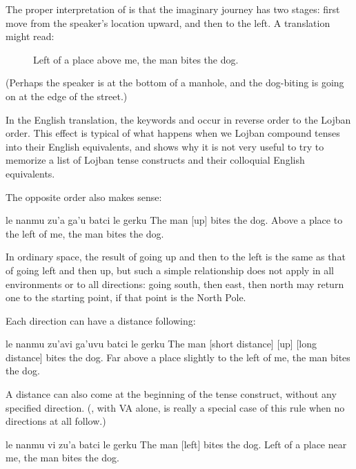 The proper interpretation of  is
    that the imaginary journey has two stages: first move from the
    speaker's location upward, and then to the left. A translation
    might read: 
\begin{description}
\item[] Left of a place above me, the man bites the dog.
\end{description}

(Perhaps the speaker is at the bottom of a manhole, and the
    dog-biting is going on at the edge of the street.) 

In the English translation, the keywords  and
     occur in reverse order to the Lojban order. This
    effect is typical of what happens when we  Lojban
    compound tenses into their English equivalents, and shows why
    it is not very useful to try to memorize a list of Lojban tense
    constructs and their colloquial English equivalents.

The opposite order also makes sense:
\begin{example}
le nanmu zu'a ga'u batci le gerku\n
The man  [up] bites the dog.\n
Above a place to the left of me, the man bites the dog.
\end{example}

In ordinary space, the result of going up and then to the left
    is the same as that of going left and then up, but such a
    simple relationship does not apply in all environments or to
    all directions: going south, then east, then north may return
    one to the starting point, if that point is the North Pole. 

Each direction can have a distance following:
\begin{example}
le nanmu zu'avi ga'uvu\n
\T	batci le gerku\n
The man  [short distance] [up] [long distance]\n
\T	bites the dog.\n
Far above a place slightly to the left of me,\n
\T	the man bites the dog.
\end{example}

A distance can also come at the beginning of the tense
    construct, without any specified direction. (, with VA alone, is really a
    special case of this rule when no directions at all follow.)
\begin{example}
le nanmu vi zu'a batci le gerku\n
The man  [left] bites the dog.\n
Left of a place near me, the man bites the dog.
\end{example}

